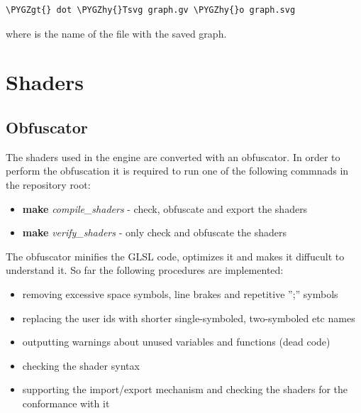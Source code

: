 \documentclass[a4paper,12pt,oneside]{sphinxmanual}
\def\PYGZgt{\char`\>}
\def\PYGZhy{\char`\-}
\begin{document}
\begin{Verbatim}[commandchars=\\\{\}]
\PYGZgt{} dot \PYGZhy{}Tsvg graph.gv \PYGZhy{}o graph.svg
\end{Verbatim}

where  is the name of the file with the saved graph.


\section{Shaders}
\label{developers_advanced:shaders}\label{developers_advanced:id8}

\subsection{Obfuscator}
\label{developers_advanced:index-0}\label{developers_advanced:id9}
The shaders used in the engine are converted with an obfuscator. In order to perform the obfuscation it is required to run one of the following commnads in the repository root:
\begin{itemize}
\item {} 
\textbf{make} \emph{compile\_shaders} - check, obfuscate and export the shaders

\item {} 
\textbf{make} \emph{verify\_shaders} - only check and obfuscate the shaders

\end{itemize}

The obfuscator minifies the GLSL code, optimizes it and makes it diffucult to understand it. So far the following procedures are implemented:
\begin{itemize}
\item {} 
removing excessive space symbols, line brakes and repetitive '';'' symbols

\item {} 
replacing the user ids with shorter single-symboled, two-symboled etc names

\item {} 
outputting warnings about unused variables and functions (dead code)

\item {} 
checking the shader syntax

\item {} 
supporting the import/export mechanism and checking the shaders for the conformance with it

\end{itemize}
\end{document}
